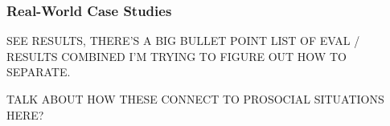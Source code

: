 \color{red}

\subsubsection{Real-World Case Studies}

SEE RESULTS, THERE'S A BIG BULLET POINT LIST OF EVAL / RESULTS COMBINED I'M TRYING TO FIGURE OUT HOW TO SEPARATE. 

TALK ABOUT HOW THESE CONNECT TO PROSOCIAL SITUATIONS HERE?

\color{black}